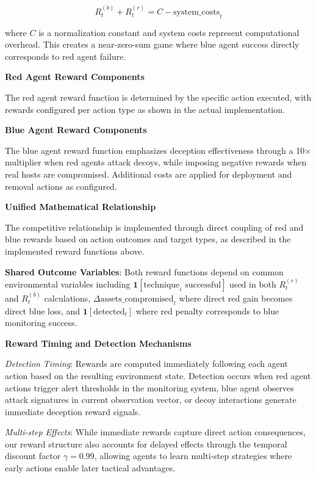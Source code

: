 \documentclass[12pt,oneside]{article}
\begin{document}
\begin{equation}
R^{(b)}_t + R^{(r)}_t = C - \text{system\_costs}_t
\end{equation}

where $C$ is a normalization constant and system costs represent computational overhead. This creates a near-zero-sum game where blue agent success directly corresponds to red agent failure.

\textbf{Red Agent Reward Components}

The red agent reward function is determined by the specific action executed, with rewards configured per action type as shown in the actual implementation.

\textbf{Blue Agent Reward Components}

The blue agent reward function emphasizes deception effectiveness through a 10× multiplier when red agents attack decoys, while imposing negative rewards when real hosts are compromised. Additional costs are applied for deployment and removal actions as configured.

\textbf{Unified Mathematical Relationship}

The competitive relationship is implemented through direct coupling of red and blue rewards based on action outcomes and target types, as described in the implemented reward functions above.

\textbf{Shared Outcome Variables}: Both reward functions depend on common environmental variables including $\mathbf{1}[\text{technique}_i \text{ successful}]$ used in both $R^{(r)}_t$ and $R^{(b)}_t$ calculations, $\Delta\text{assets\_compromised}_t$ where direct red gain becomes direct blue loss, and $\mathbf{1}[\text{detected}_t]$ where red penalty corresponds to blue monitoring success.

\textbf{Reward Timing and Detection Mechanisms}

\textit{Detection Timing}: Rewards are computed immediately following each agent action based on the resulting environment state. Detection occurs when red agent actions trigger alert thresholds in the monitoring system, blue agent observes attack signatures in current observation vector, or decoy interactions generate immediate deception reward signals.

\textit{Multi-step Effects}: While immediate rewards capture direct action consequences, our reward structure also accounts for delayed effects through the temporal discount factor $\gamma = 0.99$, allowing agents to learn multi-step strategies where early actions enable later tactical advantages.
\end{document}
